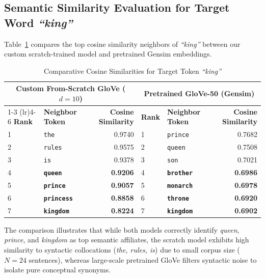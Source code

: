 \subsection{Semantic Similarity Evaluation for Target Word \textit{``king''}}
Table~\ref{tab:exp6_sim_compare} compares the top cosine similarity neighbors of \textit{``king''} between our custom scratch-trained model and pretrained Gensim embeddings.
\begin{table}[H]
\centering
\small
\caption{Comparative Cosine Similarities for Target Token \textit{``king''}}
\label{tab:exp6_sim_compare}
\begin{tabular}{llrllr}
\toprule
\multicolumn{3}{c}{\textbf{Custom From-Scratch GloVe ($d=10$)}} & \multicolumn{3}{c}{\textbf{Pretrained GloVe-50 (Gensim)}} \\
\cmidrule(lr){1-3} \cmidrule(lr){4-6}
\textbf{Rank} & \textbf{Neighbor Token} & \textbf{Cosine Similarity} & \textbf{Rank} & \textbf{Neighbor Token} & \textbf{Cosine Similarity} \\
\midrule
1 & \texttt{the} & 0.9740 & 1 & \texttt{prince} & 0.7682 \\
2 & \texttt{rules} & 0.9575 & 2 & \texttt{queen} & 0.7508 \\
3 & \texttt{is} & 0.9378 & 3 & \texttt{son} & 0.7021 \\
4 & \textbf{\texttt{queen}} & \textbf{0.9206} & 4 & \textbf{\texttt{brother}} & \textbf{0.6986} \\
5 & \textbf{\texttt{prince}} & \textbf{0.9057} & 5 & \textbf{\texttt{monarch}} & \textbf{0.6978} \\
6 & \textbf{\texttt{princess}} & \textbf{0.8858} & 6 & \textbf{\texttt{throne}} & \textbf{0.6920} \\
7 & \textbf{\texttt{kingdom}} & \textbf{0.8224} & 7 & \textbf{\texttt{kingdom}} & \textbf{0.6902} \\
\bottomrule
\end{tabular}
\end{table}

The comparison illustrates that while both models correctly identify \textit{queen}, \textit{prince}, and \textit{kingdom} as top semantic affiliates, the scratch model exhibits high similarity to syntactic collocations (\textit{the, rules, is}) due to small corpus size ($N=24$ sentences), whereas large-scale pretrained GloVe filters syntactic noise to isolate pure conceptual synonyms.

